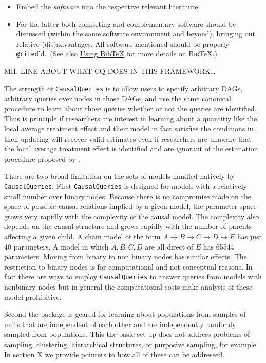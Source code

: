 \documentclass[
  article]{jss}
\providecommand{\tightlist}{%
  \setlength{\itemsep}{0pt}\setlength{\parskip}{0pt}}\usepackage{longtable,booktabs,array}
\begin{document}
\begin{itemize}
\tightlist
\item
  Embed the \emph{software} into the respective relevant literature.
\item
  For the latter both competing and complementary software should be
  discussed (within the same software environment and beyond), bringing
  out relative (dis)advantages. All software mentioned should be
  properly \texttt{@cited}'d.~(See also
  \protect\hyperlink{sec-bibtex}{Using BibTeX} for more details on
  \textsc{Bib}{\TeX}.)
\end{itemize}

MH: LINE ABOUT WHAT CQ DOES IN THIS FRAMEWORK\ldots{}

The strength of \texttt{CausalQueries} is to allow users to specify
arbitrary DAGs, arbitrary queries over nodes in those DAGs, and use the
same canonical procedure to learn about those queries whether or not the
queries are identified. Thus is principle if researchers are interest in
learning about a quantitiy like the local average treatment effect and
their model in fact satisfies the conditions in
\citet{angrist1996identification}, then updating will recover valid
estimates even if researchers are unaware that the local average
treatment effect is identified and are ignorant of the estimation
procedure proposed by \citet{angrist1996identification}.

There are two broad limitation on the sets of models handled natively by
\texttt{CausalQueries}. First \texttt{CausalQueries} is designed for
models with a relatively small number over binary nodes. Because there
is no compromise made on the space of possible causal relations implied
by a given model, the parameter space grows very rapidly with the
complexity of the causal model. The complexity also depends on the
causal structure and grows rapidly with the number of parents affecting
a given child. A chain model of the form
\(A \rightarrow B \rightarrow C \rightarrow D \rightarrow E\) has just
40 parameters. A model in which \(A, B, C, D\) are all direct of \(E\)
has 65544 parameters. Moving from binary to non binary nodes has similar
effects. The restriction to binary nodes is for computational and not
conceptual reasons. In fact there are ways to employ
\texttt{CausalQueries} to answer queries from models with nonbinary
nodes but in general the computational costs make analysis of these
model prohibitive.

Second the package is geared for learning about populations from samples
of units that are independent of each other and are independently
randomly sampled from populations. This the basic set up does not
address problems of sampling, clustering, hierarchical structures, or
purposive sampling, for example. In section X we provide pointers to how
all of these can be addressed.
\end{document}
